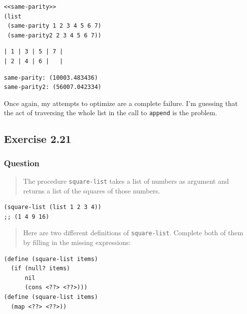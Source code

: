 \documentclass[final,fleqn,titlepage,twoside]{article}
\begin{document}
\begin{verbatim}
<<same-parity>>
(list
 (same-parity 1 2 3 4 5 6 7)
 (same-parity2 2 3 4 5 6 7))
\end{verbatim}

\begin{verbatim}
| 1 | 3 | 5 | 7 |
| 2 | 4 | 6 |   |
\end{verbatim}

\begin{verbatim}
same-parity: (10003.483436)
same-parity2: (56007.042334)
\end{verbatim}

Once again, my attempts to optimize are a complete failure. I'm guessing that
the act of traversing the whole list in the call to \texttt{append} is the
problem.

\subsection{Exercise 2.21}
\label{sec:orgd9e7e21}
\subsubsection{Question}
\label{sec:orgd3665d4}
\begin{quote}
The procedure \texttt{square-list} takes a list of numbers as argument and
returns a list of the squares of those numbers.
\end{quote}

\begin{verbatim}
(square-list (list 1 2 3 4))
;; (1 4 9 16)
\end{verbatim}

\begin{quote}
Here are two different definitions of \texttt{square-list}. Complete both of
them by filling in the missing expressions:
\end{quote}

\begin{verbatim}
(define (square-list items)
  (if (null? items)
      nil
      (cons <??> <??>)))
(define (square-list items)
  (map <??> <??>))
\end{verbatim}
\end{document}
